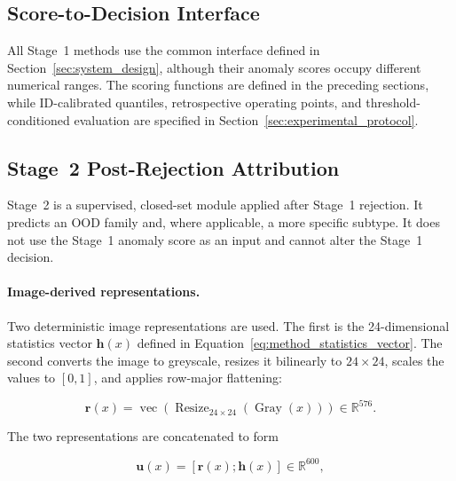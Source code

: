 \documentclass[fleqn,12pt]{olplainarticle}
\begin{document}
\subsection{Score-to-Decision Interface}
\label{subsec:threshold_interface}

All Stage~1 methods use the common interface defined in
Section~\ref{sec:system_design}, although their anomaly scores occupy
different numerical ranges. The scoring functions are defined in the preceding
sections, while ID-calibrated quantiles, retrospective operating points, and
threshold-conditioned evaluation are specified in
Section~\ref{sec:experimental_protocol}.

\subsection{Stage~2 Post-Rejection Attribution}
\label{subsec:stage2_methodology}

Stage~2 is a supervised, closed-set module applied after Stage~1 rejection. It
predicts an OOD family and, where applicable, a more specific subtype. It does
not use the Stage~1 anomaly score as an input and cannot alter the Stage~1
decision.

\paragraph{Image-derived representations.}
Two deterministic image representations are used. The first is the
24-dimensional statistics vector $\mathbf{h}(x)$ defined in
Equation~\ref{eq:method_statistics_vector}. The second converts the image to
greyscale, resizes it bilinearly to $24\times24$, scales the values to
$[0,1]$, and applies row-major flattening:

\begin{equation}
    \mathbf{r}(x)
    =
    \operatorname{vec}
    \left(
        \operatorname{Resize}_{24\times24}
        \left(
            \operatorname{Gray}(x)
        \right)
    \right)
    \in\mathbb{R}^{576}.
    \label{eq:method_stage2_pooled_pixels}
\end{equation}

The two representations are concatenated to form

\begin{equation}
    \mathbf{u}(x)
    =
    \left[
        \mathbf{r}(x);
        \mathbf{h}(x)
    \right]
    \in\mathbb{R}^{600},
    \label{eq:method_stage2_fusion}
\end{equation}
\end{document}
